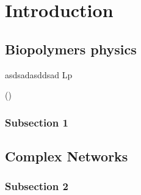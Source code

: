 
\chapter{Introduction} %

\label{Introduction} %



    
    

\section{Biopolymers physics}


 asdsadasddsad 
\gls{Lp}  
     

 (\citet{storm_nonlinear_2005})
\citet{stein_algorithm_2008}



\subsection{Subsection 1}






\section{Complex Networks}

\subsection{Subsection 2}